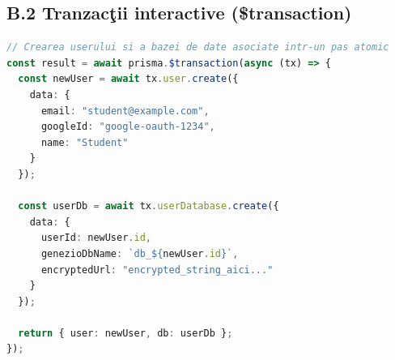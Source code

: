 \documentclass[12pt,onecolumn,draftclsnofoot]{IEEEtran}
\begin{document}
\newpage
\subsection*{B.2 Tranzac\c{t}ii interactive (\$transaction)}
\begin{lstlisting}[language=TypeScript]
// Crearea userului si a bazei de date asociate intr-un pas atomic
const result = await prisma.$transaction(async (tx) => {
  const newUser = await tx.user.create({
    data: {
      email: "student@example.com",
      googleId: "google-oauth-1234",
      name: "Student"
    }
  });

  const userDb = await tx.userDatabase.create({
    data: {
      userId: newUser.id,
      genezioDbName: `db_${newUser.id}`,
      encryptedUrl: "encrypted_string_aici..."
    }
  });

  return { user: newUser, db: userDb };
});
\end{lstlisting}
\end{document}

